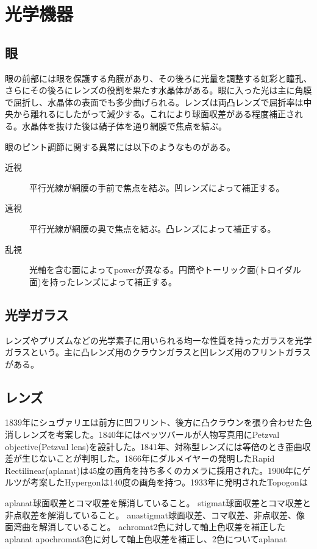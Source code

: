 \section{光学機器}

\subsection{眼}
	眼の前部には眼を保護する角膜があり、その後ろに光量を調整する虹彩と瞳孔、さらにその後ろにレンズの役割を果たす水晶体がある。眼に入った光は主に角膜で屈折し、水晶体の表面でも多少曲げられる。レンズは両凸レンズで屈折率は中央から離れるにしたがって減少する。これにより球面収差がある程度補正される。水晶体を抜けた後は硝子体を通り網膜で焦点を結ぶ。

	眼のピント調節に関する異常には以下のようなものがある。
	\begin{description}
		\item[近視] 平行光線が網膜の手前で焦点を結ぶ。凹レンズによって補正する。
		\item[遠視] 平行光線が網膜の奥で焦点を結ぶ。凸レンズによって補正する。
		\item[乱視] 光軸を含む面によってpowerが異なる。円筒やトーリック面(トロイダル面)を持ったレンズによって補正する。
	\end{description}
\subsection{光学ガラス}
	レンズやプリズムなどの光学素子に用いられる均一な性質を持ったガラスを光学ガラスという。主に凸レンズ用のクラウンガラスと凹レンズ用のフリントガラスがある。
\subsection{レンズ}
	1839年にシュヴァリエは前方に凹フリント、後方に凸クラウンを張り合わせた色消しレンズを考案した。1840年にはペッツバールが人物写真用にPetzval objective(Petzval lens)を設計した。1841年、対称型レンズには等倍のとき歪曲収差が生じないことが判明した。1866年にダルメイヤーの発明したRapid Rectilinear(aplanat)は45度の画角を持ち多くのカメラに採用された。1900年にゲルツが考案したHypergonは140度の画角を持つ。1933年に発明されたTopogonは

	aplanat球面収差とコマ収差を解消していること。
	stigmat球面収差とコマ収差と非点収差を解消していること。
	anastigmat球面収差、コマ収差、非点収差、像面湾曲を解消していること。
	achromat2色に対して軸上色収差を補正したaplanat
	apochromat3色に対して軸上色収差を補正し、2色についてaplanat
